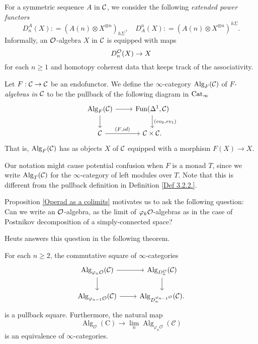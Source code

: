 For a symmetric sequence $A$ in ${\mathcal{C}}$, we consider the following \emph{extended power functors}
\begin{equation}
\label{extended power}
    D^{A}_n(X): = (A(n)\otimes X^{\otimes n })_{h\Sigma}, 
\quad
D_{A}^n(X): = (A(n)\otimes X^{\otimes n })^{h\Sigma}.
\end{equation}
Informally, an ${\mathcal{O}}$-algebra $X$ in ${\mathcal{C}}$ is equipped with maps
$$
D^{{\mathcal{O}}}_n(X) \to X
$$
for each $n\geq 1$ and homotopy coherent data that keeps track of the associativity.

\begin{definition}
\label{Def 3.2.2.}
Let $F:{\mathcal{C}}\to {\mathcal{C}}$ be an endofunctor.
	We define the $\infty$-category $\operatorname{Alg}_{F}({\mathcal{C}})$ of \emph{$F$-algebras in ${\mathcal{C}}$} to be the pullback of the following diagram in $\operatorname{Cat}_{\infty}$
\[
\begin{tikzcd}
	\Alg_{F}(\CC) & 
	\Fun(\Delta^1, \CC)\\
	\CC & 
	\CC \times \CC
	\arrow[from=1-1, to= 1-2]
	\arrow[from=1-1, to=2-1]
	\arrow[from=1-2, to=2-2, "(ev_0\text{,} ev_1)"]
	\arrow[from=2-1, to= 2-2, "(F\text{,} id)"].
\end{tikzcd}
\]
That is, $\operatorname{Alg}_{F}({\mathcal{C}})$ has as objects $X$ of ${\mathcal{C}}$ equipped with a morphism $F(X)\to X$.
\end{definition}

\begin{remark}
Our notation might cause potential confusion when $F$ is a monad $T$, since we write $\operatorname{Alg}_T({\mathcal{C}})$ for the $\infty$-category of left modules over $T$. Note that this is different from the pullback definition in Definition \ref{Def 3.2.2.}. 
\end{remark}

Proposition \ref{Operad as a colimits} motivates us to ask the following question: Can we write an ${\mathcal{O}}$-algebra, as the limit of $\varphi_k{\mathcal{O}}$-algebras as in the case of Postnikov decomposition of a simply-connected space? 

Heuts answers this question in the following theorem.
\begin{theorem}
\cite[Theorem 4.1]{Heuts_Koszul}
\label{Thm 4.1 of Heuts Koszul Duality paper}
For each $n \geq 2$, the commutative square of $\infty$-categories
\[
\begin{tikzcd}
	\Alg_{\varphi_n\CO}(\CC) & 
	\Alg_{D^{\CO}_{n}}(\CC)\\
	\Alg_{\varphi_{n-1}\CO} (\CC)  & 
	\Alg_{D_{n}^{\varphi_{n-1}\CO}}(\CC)
	\arrow[from=1-1, to= 1-2]
	\arrow[from=1-1, to=2-1]
	\arrow[from=1-2, to=2-2]
	\arrow[from=2-1, to= 2-2].
\end{tikzcd}
\]
is a pullback square. Furthermore, the natural map
$$
\operatorname{Alg}_{\mathcal{O}}(\mathrm{C}) \rightarrow \lim _{n} \operatorname{Alg}_{\varphi_{n} \mathcal{O}}(\mathcal{C})
$$
is an equivalence of $\infty$-categories.
\end{theorem}

